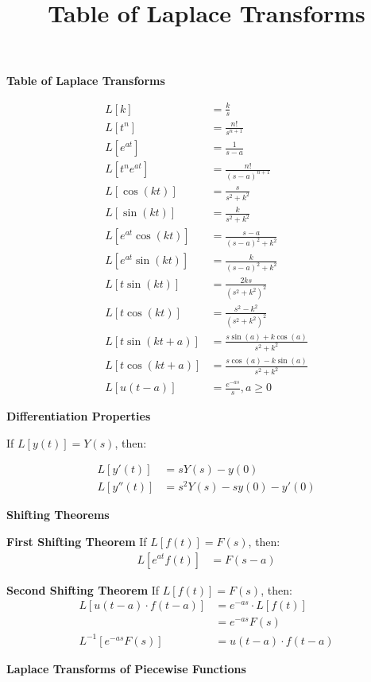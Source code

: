 \documentclass[10pt]{article}
\title{Table of Laplace Transforms}
\begin{document}
\textbf{Table of Laplace Transforms}

\begin{align}
    L[k] &= \frac{k}{s} \\
    L[t^n] &= \frac{n!}{s^{n+1}} \\
    L[e^{at}] &= \frac{1}{s - a}\\
    L[t^n e^{at}] &= \frac{n!}{(s-a)^{n+1}} \\
    L[\cos(kt)] &= \frac{s}{s^2 + k^2} \\
    L[\sin(kt)] &= \frac{k}{s^2 + k^2} \\
    L[e^{at} \cos(kt)] &= \frac{s - a}{(s - a)^2 + k^2} \\
    L[e^{at} \sin(kt)] &= \frac{k}{(s - a)^2 + k^2} \\
    L[t \sin(kt)] &= \frac{2ks}{(s^2 + k^2)^2} \\
    L[t \cos(kt)] &= \frac{s^2 - k^2}{(s^2 + k^2)^2}\\
    L[t \sin(kt+a)] &= \frac{s\sin(a) + k \cos(a)}{s^2 + k^2} \\
    L[t \cos(kt + a)] &= \frac{s \cos(a) - k \sin(a)}{s^2 + k^2} \\
    L[u(t-a)] &= \frac{e^{-as}}{s}, a \geq 0
\end{align}

\textbf{Differentiation Properties}

If \( L[y(t)] = Y(s) \), then:

\begin{align}
    L[y'(t)] &= sY(s) - y(0) \\
    L[y''(t)] &= s^2 Y(s) - sy(0) - y'(0)
\end{align}

\textbf{Shifting Theorems}

\textbf{First Shifting Theorem}
If \( L[f(t)] = F(s) \), then:
\begin{align}
    L[e^{at} f(t)] &= F(s - a)
\end{align}


\textbf{Second Shifting Theorem}
If \( L[f(t)] = F(s) \), then:
\begin{align}
    L[u(t - a) \cdot f(t - a)] &= e^{-as} \cdot L[f(t)] \\ 
                                &= e^{-as} F(s) \\
    L^{-1}[e^{-as} F(s)] &= u(t - a) \cdot f(t - a)
\end{align}

\textbf{Laplace Transforms of Piecewise Functions}
\end{document}
